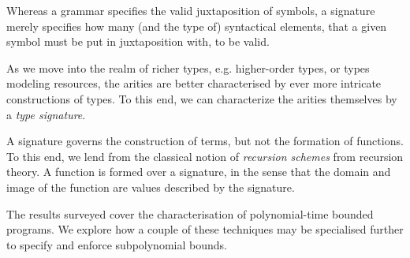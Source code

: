 Whereas a grammar specifies the valid juxtaposition of symbols, a signature
merely specifies how many (and the type of) syntactical elements, that a given
symbol must be put in juxtaposition with, to be valid.


As we move into the realm of richer types, e.g. higher-order types, or types
modeling resources, the arities are better characterised by ever more intricate
constructions of types. To this end, we can characterize the arities themselves
by a \emph{type signature}.


A signature governs the construction of terms, but not the formation of
functions. To this end, we lend from the classical notion of \emph{recursion
schemes} from recursion theory. A function is formed over a signature, in the
sense that the domain and image of the function are values described by the
signature.

The results surveyed cover the characterisation of polynomial-time bounded
programs. We explore how a couple of these techniques may be specialised
further to specify and enforce subpolynomial bounds.








